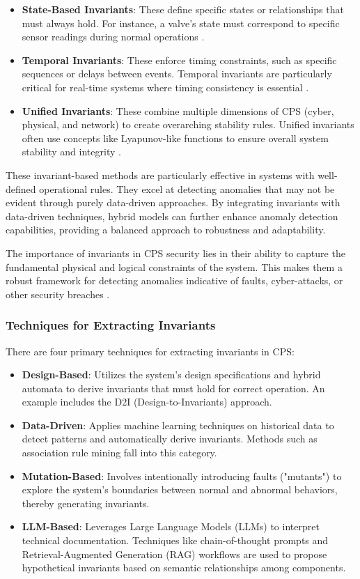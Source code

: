 \begin{itemize}
    \item \textbf{State-Based Invariants}: These define specific states or relationships that must always hold. For instance, a valve's state must correspond to specific sensor readings during normal operations \cite{26}.
    \item \textbf{Temporal Invariants}: These enforce timing constraints, such as specific sequences or delays between events. Temporal invariants are particularly critical for real-time systems where timing consistency is essential \cite{22}.
    \item \textbf{Unified Invariants}: These combine multiple dimensions of CPS (cyber, physical, and network) to create overarching stability rules. Unified invariants often use concepts like Lyapunov-like functions to ensure overall system stability and integrity \cite{29}.
\end{itemize}

These invariant-based methods are particularly effective in systems with well-defined operational rules. They excel at detecting anomalies that may not be evident through purely data-driven approaches. By integrating invariants with data-driven techniques, hybrid models can further enhance anomaly detection capabilities, providing a balanced approach to robustness and adaptability.

The importance of invariants in CPS security lies in their ability to capture the fundamental physical and logical constraints of the system. This makes them a robust framework for detecting anomalies indicative of faults, cyber-attacks, or other security breaches \cite{21,23}.


\subsubsection{Techniques for Extracting Invariants}

There are four primary techniques for extracting invariants in CPS:

\begin{itemize}
    \item \textbf{Design-Based}\cite{26,27,29}: Utilizes the system's design specifications and hybrid automata to derive invariants that must hold for correct operation. An example includes the D2I (Design-to-Invariants) approach.
    \item \textbf{Data-Driven}\cite{24,25,28}: Applies machine learning techniques on historical data to detect patterns and automatically derive invariants. Methods such as association rule mining fall into this category.
    \item \textbf{Mutation-Based}\cite{25}: Involves intentionally introducing faults ("mutants") to explore the system's boundaries between normal and abnormal behaviors, thereby generating invariants.
    \item \textbf{LLM-Based}\cite{116}: Leverages Large Language Models (LLMs) to interpret technical documentation. Techniques like chain-of-thought prompts and Retrieval-Augmented Generation (RAG) workflows are used to propose hypothetical invariants based on semantic relationships among components.
\end{itemize}

